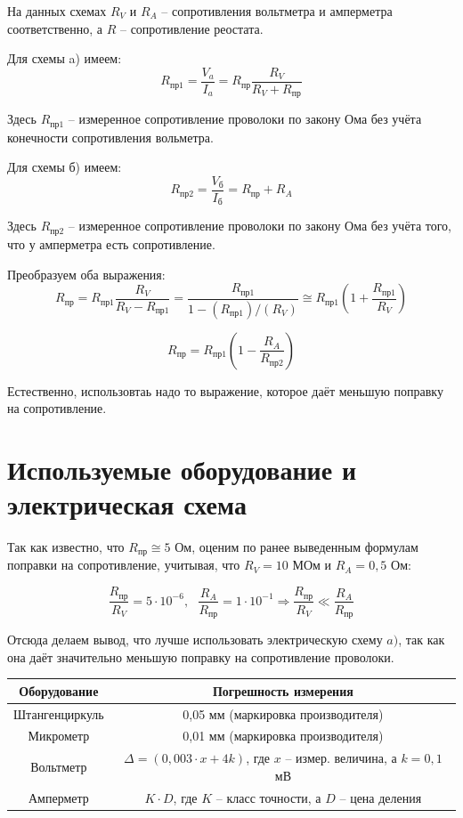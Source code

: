 \documentclass[a4paper, 12pt]{article} %
\begin{document}
На данных схемах $R_V$ и $R_A$ -- сопротивления вольтметра и амперметра соответственно, а $R$ -- сопротивление реостата.

Для схемы a) имеем:
\[R_{\text{пр1}} = \frac{V_a}{I_a} = R_{\text{пр}} \frac{R_V}{R_V + R_{\text{пр}}} \]

Здесь $R_{\text{пр1}}$ -- измеренное сопротивление проволоки по закону Ома без учёта конечности сопротивления вольметра.

Для схемы б) имеем:
\[R_{\text{пр2}} = \frac{V_{\text{б}}}{I_{\text{б}}} = R_{\text{пр}} + R_A\]

Здесь $R_{\text{пр2}}$ -- измеренное сопротивление проволоки по закону Ома без учёта того, что у амперметра есть сопротивление.

Преобразуем оба выражения:
\[R_{\text{пр}} = R_{\text{пр1}} \frac{R_V}{R_V - R_{\text{пр1}}} = \frac{R_{\text{пр1}}}{1 - (R_{\text{пр1}})/(R_V)} \cong R_{\text{пр1}} (1 + \frac{R_{\text{пр1}}}{R_V})\]

\[R_{\text{пр}} = R_{\text{пр1}} (1 - \frac{R_A}{R_{\text{пр2}}})\]

Естественно, использовтаь надо то выражение, которое даёт меньшую поправку на сопротивление.\\

\section{Используемые оборудование и электрическая схема}

Так как известно, что $R_{\text{пр}}\cong 5$ Ом, оценим по ранее выведенным формулам поправки на сопротивление, учитывая, что $R_V = 10$ МОм и $R_A = 0,5$ Ом:

\[\frac{R_{\text{пр}}}{R_V} = 5 \cdot 10^{-6}, \text{ } \frac{R_A}{R_{\text{пр}}} = 1 \cdot 10^{-1} \Rightarrow \frac{R_{\text{пр}}}{R_V} \ll \frac{R_A}{R_{\text{пр}}}\]

Отсюда делаем вывод, что лучше использовать электрическую схему $a)$, так как она даёт значительно меньшую поправку на сопротивление проволоки.

\begin{center}
\begin{tabular}{|c|c|}
\hline 
Оборудование & Погрешность измерения \\ 
\hline 
Штангенциркуль & 0,05 мм (маркировка производителя) \\ 
\hline 
Микрометр & 0,01 мм (маркировка производителя) \\
\hline 
Вольтметр & $\Delta = (0,003\cdot x + 4k)$, где $x$ -- измер. величина, а $k = 0,1$ мВ \\ 
\hline 
Амперметр & $K\cdot D$, где $K$ -- класс точности, а $D$ -- цена деления \\ 
\hline 
\end{tabular} 
\end{center}
\end{document}
